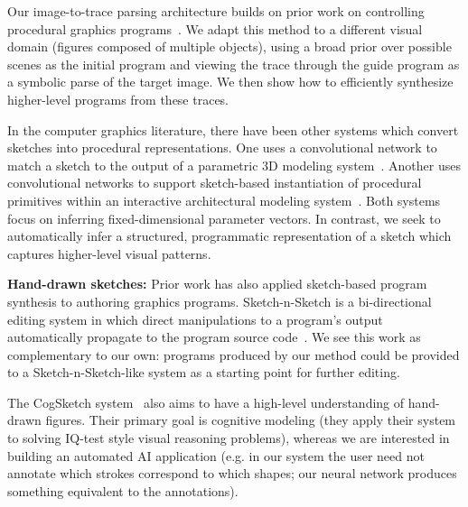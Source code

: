 \documentclass{article}
\theoremstyle{definition}
\begin{document}
Our image-to-trace parsing architecture builds on prior work on controlling procedural graphics programs~\citep{ritchie2016neurally}.
We adapt this method to a different visual domain (figures composed of multiple objects), using a broad prior over possible scenes as the initial program and viewing the trace through the guide program as a symbolic parse of the target image.
We then show how to efficiently synthesize higher-level programs from these traces.

In the computer graphics literature, there have been other systems which convert sketches into procedural representations. One uses a convolutional network to match a sketch to the output of a parametric 3D modeling system~\citep{huang2017shape}. Another uses convolutional networks to support sketch-based instantiation of procedural primitives within an interactive architectural modeling system~\citep{Nishida:2016:ISU:2897824.2925951}. Both systems focus on inferring fixed-dimensional parameter vectors. In contrast, we seek to automatically infer a structured, programmatic representation of a sketch which captures higher-level visual patterns.

\textbf{Hand-drawn sketches:} Prior work has also applied sketch-based program synthesis to authoring graphics programs. Sketch-n-Sketch is a bi-directional editing system in which direct manipulations to a program's output automatically propagate to the program source code~\citep{Hempel:2016:SSP:2984511.2984575}. We see this work as complementary to our own: programs produced by our method could be provided to a Sketch-n-Sketch-like system as a starting point for further editing.

The CogSketch system~\citep{forbus2011cogsketch} also aims to have a high-level understanding of hand-drawn figures. Their primary goal is cognitive modeling (they apply their system to solving IQ-test style visual reasoning problems), whereas we are interested in building an automated AI application (e.g. in our system the user need not annotate which strokes correspond to which shapes; our neural network produces something equivalent to the annotations).
\end{document}
